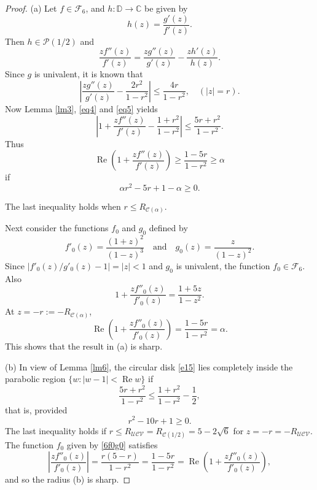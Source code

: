 \documentclass{amsart}
\begin{document}
\begin{proof}

(a) Let $f\in \mathcal{F}_6$, and $h:\mathbb{D}\rightarrow \mathbb{C}$ be given by
\[h(z)=\frac{g'(z)}{f'(z)}.\]
 Then  $h \in\mathcal{P}(1/2) $ and
\begin{equation}\label{eq4}
\frac{zf''(z)}{f'(z)}=\frac{zg''(z)}{g'(z)}-\frac{z h'(z)}{h(z)}.
\end{equation}
   Since $g $ is univalent, it is known \cite[Theorem 2.4, p.\ 32]{duren} that
\begin{equation}\label{eq5}
\left|\frac{zg''(z)}{g'(z)}-\frac{2r^2}{1-r^2}\right|\leq\frac{4r}{1-r^2},\quad(|z|=r).
\end{equation}
Now Lemma \ref{lm3}, \eqref{eq4} and \eqref{eq5} yields
\begin{equation}\label{e15}
\left| 1+\frac{zf''(z)}{f'(z)} -\frac{1+r^2}{1-r^2}\right|\leq\frac{5r+r^2}{1-r^2}.
\end{equation}
Thus
\[\operatorname{Re}\left(1+\frac{zf''(z)}{f'(z)}\right) \geq\frac{1-5r}{1-r^2}\geq\alpha\]
if
\[\alpha r^2-5r+1-\alpha\geq0.\]
 
The last inequality holds when  $r\leq R_{\mathcal{C}(\alpha)}$.

Next consider the functions $f_0$ and $g_0$ defined by
\begin{equation}\label{6f0g0}
f'_0(z)=\frac{(1+z)^2}{(1-z)^3} \quad \text{and} \quad g_0(z)= \frac{z}{(1-z)^2}.
\end{equation}
Since $\left| f'_0(z)/g'_0(z)-1\right|=|z|<1$  and $g_0$ is univalent,  the function
$f_0 \in \mathcal{F}_6$. Also
\[1+\frac{zf''_0(z)}{f'_0(z)}=\frac{1+5z }{1-z^2}.\]
At $z=-r:=-R_{\mathcal{C}(\alpha)}$,
\[\operatorname{Re}\left(1+\frac{zf''_0(z)}{f'_0(z)}\right)=\frac{1-5r }{1-r^2}=\alpha.\]
This shows that  the result in (a)  is sharp.

(b) In view of Lemma \ref{lm6}, the  circular disk \eqref{e15} lies completely  inside the parabolic region $\{w:|w-1|<\operatorname{Re} w\}$ if
\[\frac{5r+r^2}{1-r^2}\leq\frac{1+r^2}{1-r^2}-\frac{1}{2},\]
that is, provided
\begin{equation}\label{eq6.1}
r^2 -10r+1\geq0.
\end{equation}
The last inequality   holds if  $r\leq R_{\mathcal{UCV}}=R_{\mathcal{C}( 1/2)}=5-2\sqrt{6} $ for $z=-r=-R_{\mathcal{UCV}}$.
The function $f_0$ given by \eqref{6f0g0} satisfies
\[\left| \frac{zf''_0(z)}{f'_0(z)}\right|  =\frac{r(5-r)}{1-r^2}=\frac{1-5r}{1-r^2}
 =\operatorname{Re}\left(1+\frac{zf''_0(z)}{f'_0(z)}\right),\]
and so the radius (b) is sharp.
\end{proof}
\end{document}
